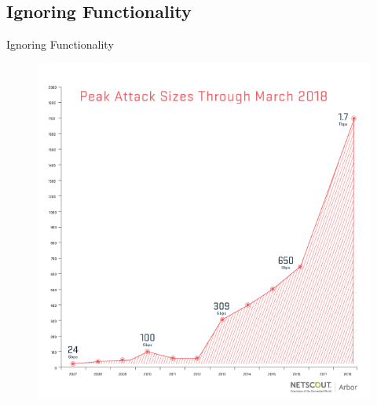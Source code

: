 \documentclass[11pt,t,usepdftitle=false,aspectratio=169]{beamer}
\begin{document}
\subsection{Ignoring Functionality}
\begin{frame}{Ignoring Functionality}


	\pause{}
	\begin{figure}
		\centering
		\includegraphics[keepaspectratio,height=.85 \paperheight]{img/DDoS_growth}
	\end{figure}
\end{frame}
\end{document}
